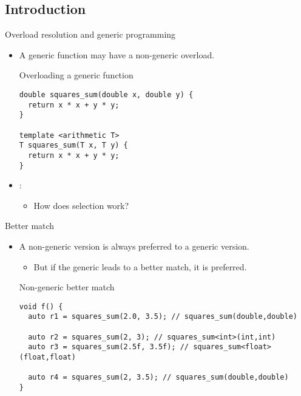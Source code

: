 \subsection{Introduction}

\begin{frame}[t,fragile]{Overload resolution and generic programming}
\begin{itemize}
  \item A generic function may have a non-generic overload.

\begin{block}{Overloading a generic function}
\begin{lstlisting}
double squares_sum(double x, double y) {
  return x * x + y * y;
}

template <arithmetic T>
T squares_sum(T x, T y) {
  return x * x + y * y;
}
\end{lstlisting}
\end{block}

  \item {}:
    \begin{itemize}
      \item How does selection work?
    \end{itemize}

\end{itemize}
\end{frame}

\begin{frame}[t,fragile]{Better match}
\begin{itemize}
  \item A non-generic version is always preferred to a generic version.
    \begin{itemize}
      \item But if the generic leads to a better match, it is preferred.
    \end{itemize}

\begin{block}{Non-generic better match}
\begin{lstlisting}
void f() {
  auto r1 = squares_sum(2.0, 3.5); // squares_sum(double,double)

  auto r2 = squares_sum(2, 3); // squares_sum<int>(int,int)
  auto r3 = squares_sum(2.5f, 3.5f); // squares_sum<float>(float,float)

  auto r4 = squares_sum(2, 3.5); // squares_sum(double,double)
}
\end{lstlisting}
\end{block}
\end{itemize}
\end{frame}


